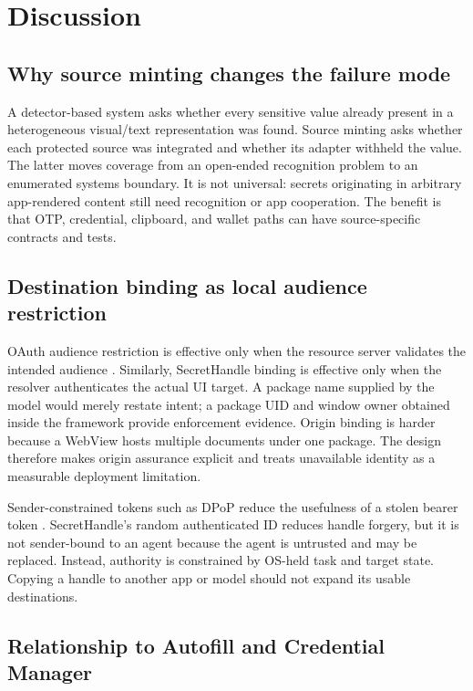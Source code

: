 \section{Discussion}
\label{sec:discussion}

\subsection{Why source minting changes the failure mode}

A detector-based system asks whether every sensitive value already present in a heterogeneous visual/text representation was found. Source minting asks whether each protected source was integrated and whether its adapter withheld the value. The latter moves coverage from an open-ended recognition problem to an enumerated systems boundary. It is not universal: secrets originating in arbitrary app-rendered content still need recognition or app cooperation. The benefit is that OTP, credential, clipboard, and wallet paths can have source-specific contracts and tests.

\subsection{Destination binding as local audience restriction}

OAuth audience restriction is effective only when the resource server validates the intended audience \cite{rfc8707}. Similarly, SecretHandle binding is effective only when the resolver authenticates the actual UI target. A package name supplied by the model would merely restate intent; a package UID and window owner obtained inside the framework provide enforcement evidence. Origin binding is harder because a WebView hosts multiple documents under one package. The design therefore makes origin assurance explicit and treats unavailable identity as a measurable deployment limitation.

Sender-constrained tokens such as DPoP reduce the usefulness of a stolen bearer token \cite{rfc9449}. SecretHandle's random authenticated ID reduces handle forgery, but it is not sender-bound to an agent because the agent is untrusted and may be replaced. Instead, authority is constrained by OS-held task and target state. Copying a handle to another app or model should not expand its usable destinations.

\subsection{Relationship to Autofill and Credential Manager}


